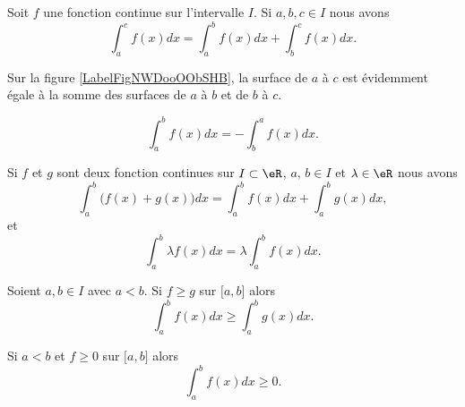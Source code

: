 \begin{proposition}
    Soit  \( f\) une fonction continue sur l'intervalle \( I\). Si \( a,b,c\in I\) nous avons
    \begin{equation}
        \int_a^cf(x)dx=\int_a^bf(x)dx+\int_b^cf(x)dx.
    \end{equation}
\end{proposition}

Sur la figure \ref{LabelFigNWDooOObSHB}, la surface de \( a\) à \( c\) est évidemment égale à la somme des surfaces de \( a\) à \( b\) et de \( b\) à \( c\).
\newcommand{\CaptionFigNWDooOObSHB}{Illustration pour les relations de Chasles.}


\begin{corollary}
  \begin{equation}
        \int_a^bf(x)dx=-\int_b^af(x)dx.
    \end{equation}
\end{corollary}

\begin{proposition}\label{lineariteintegrale}
    Si $f$ et $g$ sont deux fonction continues sur $I\subset\eR$, $a, \, b\in I$ et \( \lambda\in \eR\) nous avons
    \begin{equation}
        \int_a^b\big( f(x)+g(x) \big)dx=\int_a^bf(x)dx+\int_a^bg(x)dx,
    \end{equation}
    et
    \begin{equation}
        \int_a^b \lambda f(x)dx=\lambda\int_a^bf(x)dx.
    \end{equation}
\end{proposition}

\begin{proposition}   \label{PropCJIooHqECbq}
    Soient \( a,b\in I\) avec \( a<b\). Si \( f\geq g\) sur \( \mathopen[ a , b \mathclose]\) alors
    \begin{equation}
        \int_a^bf(x)dx\geq \int_a^bg(x)dx.
    \end{equation}
\end{proposition}

\begin{corollary}[Positivité] \label{PropHVWooBDRhCX}
    Si \( a<b\) et \( f\geq 0\) sur \( \mathopen[ a , b \mathclose]\) alors
    \begin{equation}
        \int_a^bf(x)dx\geq 0.
    \end{equation}
\end{corollary}

